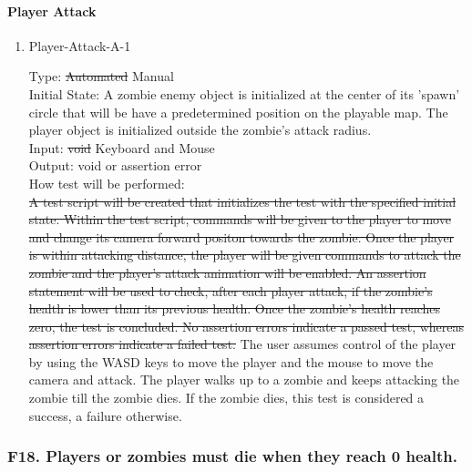 \documentclass[12pt, titlepage]{article}
\DeclareRobustCommand{\hsout}[1]{\texorpdfstring{\sout{#1}}{#1}}
\newcounter{ftnum}
\begin{document}
\paragraph{Player Attack}

\begin{enumerate}

\item{Player-Attack-A-1\\}  \label{F17-1}

Type: \hsout{Automated} {\color{magenta} Manual} \\
					
Initial State: A zombie enemy object is initialized at the center of its 'spawn' circle that will be have a predetermined position on the playable map. The player object is initialized outside the zombie's attack radius.\\
					
Input: \hsout{void} {\color{magenta} Keyboard and Mouse} \\
					
Output: void or assertion error \\
					
How test will be performed:\\  \hsout{A test script will be created that initializes the test with the specified initial state. Within the test script, commands will be given to the player to move and change its camera forward positon towards the zombie. Once the player is within attacking distance, the player will be given commands to attack the zombie and the player's attack animation will be enabled. An assertion statement will be used to check, after each player attack, if the zombie's health is lower than its previous health. Once the zombie's health reaches zero, the test is concluded. No assertion errors indicate a passed test, whereas assertion errors indicate a failed test.} {\color{magenta}The user assumes control of the player by using the WASD keys to move the player and the mouse to move the camera and attack. The player walks up to a zombie and keeps attacking the zombie till the zombie dies. If the zombie dies, this test is considered a success, a failure otherwise.}\\

\end{enumerate}

\subsubsection{{\color{magenta} F18.} Players or zombies must die when they reach 0 health.} 
\end{document}
